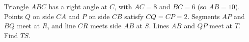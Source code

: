 Triangle $ABC$ has a right angle at $C$, with $AC=8$ and $BC=6$ (so $AB=10$). Points $Q$ on side $CA$ and $P$ on side $CB$ satisfy $CQ=CP=2$. Segments $AP$ and $BQ$ meet at $R$, and line $CR$ meets side $AB$ at $S$. Lines $AB$ and $QP$ meet at $T$. Find $TS$.

